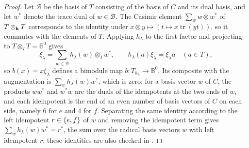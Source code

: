 \begin{proof}
  Let $\mathcal{B}$ be the basis of $T$ consisting of the basis of $C$ and its
  dual basis, and let $w^*$ denote the trace dual of ${w\in\mathcal{B}}$. The
  Casimir element ${\sum_ww\otimes w^*}$ of ${T\otimes_{\mathbf{k}} T}$ corresponds to the
  identity under ${x\otimes y\mapsto(t\mapsto x\operatorname{tr}(yt))}$, so it
  commutes with the elements of $T$. Applying $h_\lambda$ to the first factor
  and projecting to ${T\otimes_IT=\mathbb{B}^0}$ gives
  \[
    \xi_\lambda=\sum_{w\in\mathcal{B}}h_\lambda(w)\otimes_Iw^*,\qquad
    h_\lambda(a)\xi_\lambda=\xi_\lambda a\quad(a\in T),
  \]
  so ${b(x)=x\xi_\lambda}$ defines a bimodule map ${b\colon T_{h_\lambda}\to
  \mathbb{B}^0}$. Its composite with the augmentation is $\sum_wh_\lambda(w)w^*$,
  which is zero: for a basis vector $w$ of $C$, the products $ww^*$ and $w^*w$
  are the duals of the idempotents at the two ends of $w$, and each idempotent
  is the end of an even number of basis vectors of $C$ on each side, namely
  $6$ for $e$ and $4$ for $f$. Separating the same identity according to the
  left idempotent ${r\in\set{e,f}}$ of $w$ and removing the idempotent term gives
  ${\sum_{w}h_\lambda(w)w^*=r^*}$, the sum over the radical basis vectors $w$
  with left idempotent $r$; these identities are also checked in
  .


\end{proof}
